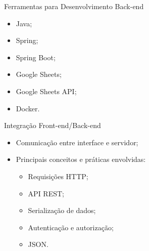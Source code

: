 \begin{frame}{Ferramentas para Desenvolvimento Back-end}
    \begin{itemize}
        \item Java; \vspace{0.5cm}
        \item Spring; \vspace{0.5cm}
        \item Spring Boot; \vspace{0.5cm}
        \item Google Sheets; \vspace{0.5cm}
        \item Google Sheets API; \vspace{0.5cm}
        \item Docker. \vspace{0.5cm}
    \end{itemize}
\end{frame}

\begin{frame}{Integração Front-end/Back-end}
    \begin{itemize}
        \item Comunicação entre interface e servidor; \vspace{0.5cm}
        \item Principais conceitos e práticas envolvidas: \vspace{0.5cm}
              \begin{itemize}
                  \item Requisições HTTP; \vspace{0.25cm}
                  \item API REST; \vspace{0.25cm}
                  \item Serialização de dados; \vspace{0.25cm}
                  \item Autenticação e autorização; \vspace{0.25cm}
                  \item JSON. \vspace{0.25cm}
              \end{itemize}
    \end{itemize}
\end{frame}
















